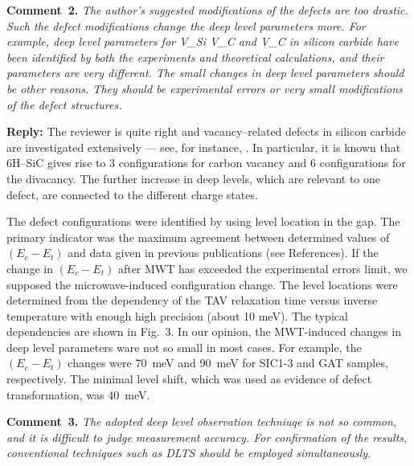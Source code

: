 \documentclass[10pt]{iopart}
\begin{document}
\vspace{1cm}
\noindent
\textcolor[rgb]{0.00,0.50,1.00}{\textbf{Comment~2.}}
\emph{The author's suggested modifications of the defects are too drastic.
Such the defect modifications change the deep level parameters more.
For example, deep level parameters for V\_Si V\_C and V\_C in silicon carbide have been
identified by both the experiments and theoretical calculations,
and their parameters are very different.
The small changes in deep level parameters should be other reasons.
They should be experimental errors or very small modifications of the defect structures.}

\noindent
\textcolor[rgb]{0.51,0.00,0.00}{\textbf{Reply:}}
The reviewer is quite right and vacancy--related defects in silicon carbide are investigated extensively ---
see, for instance, \cite{6HSiC:Vsi,4HSiC:Vc,6HSiC:VV2019,4HSiC:Vacan,SiC:defEPR,6HSiC:VPAS,4HSiC:VV,SiC:bookCh6,
6HSiC:Vsi2021,6HSiC:vac2021,4HSiC:NV,SiC:NV}.
In particular, it is known \cite{6HSiC:VV2019} that
6H--SiC gives rise to 3 configurations for carbon vacancy
and 6 configurations for the divacancy.
The further increase in deep levels, which are relevant to one defect, are connected to the different charge states.

The defect configurations were identified by using level location in the gap.
The primary indicator was the maximum agreement between determined values of $(E_c-E_t)$ and data given in
previous publications (see References).
If the change in $(E_c-E_t)$ after MWT has exceeded the experimental errors limit,
we supposed the microwave-induced configuration change.
The level locations were determined from the dependency of the TAV relaxation time
versus inverse temperature with enough high precision  (about 10 meV).
The typical dependencies are shown in Fig.~3.
In our opinion, the MWT-induced changes in deep level parameters ware not so small in most cases.
For example, the $(E_c-E_t)$ changes were 70~meV and 90~meV for SIC1-3 and GAT samples, respectively.
The minimal level shift, which was used as evidence of defect transformation, was 40~meV.





\vspace{1cm}
\noindent
\textcolor[rgb]{0.00,0.50,1.00}{\textbf{Comment~3.}}
\emph{The adopted deep level observation techniuqe is not so common,
and it is difficult to judge measurement accuracy.
For confirmation of the results, conventional techniques such as DLTS should be employed simultaneously.}
\end{document}
